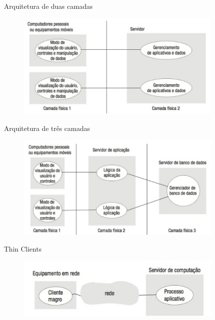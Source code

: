 \documentclass[aspectratio=169,
				xcolor=table]{beamer}
\begin{document}
	\begin{frame}{Arquitetura de duas camadas}
		\begin{figure}[hbtp]
		\centering
		\includegraphics[width=0.9\textwidth, keepaspectratio]{../figs/cap02/duascamadas.png}
		\end{figure}
	\end{frame}
	
	\begin{frame}{Arquitetura de três camadas}
		\begin{figure}[hbtp]
		\centering
		\includegraphics[width=0.9\textwidth, keepaspectratio]{../figs/cap02/trescamadas.png}
		\end{figure}
	\end{frame}

	\begin{frame}{Thin Clients}
		\begin{figure}[hbtp]
		\centering
		\includegraphics[width=0.9\textwidth, keepaspectratio]{../figs/cap02/thin.png}
		\end{figure}
	\end{frame}

	\begin{frame}{}
	\end{frame}	
\end{document}
